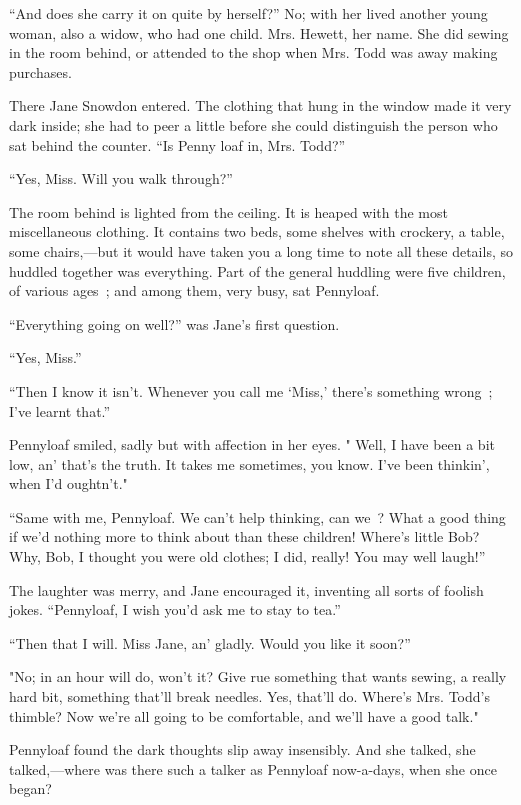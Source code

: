 ``And does she carry it on quite by herself?'' No; with her lived
another young woman, also a widow, who had one child. Mrs. Hewett, her
name. She did sewing in the room behind, or attended to the shop when
Mrs. Todd was away making purchases.

There Jane Snowdon entered. The clothing that hung in the window made it
very dark inside; she had to peer a little before she could distinguish
the person who sat behind the counter. ``Is Penny loaf in, Mrs. Todd?''

``Yes, Miss. Will you walk through?''

The room behind is lighted from the ceiling. It is heaped with the most
miscellaneous clothing. It contains two beds, some shelves with
crockery, a table, some chairs,---but it would have taken you a long
time to note all these {} details, so huddled together was everything.
Part of the general huddling were five children, of various ages~; and
among them, very busy, sat Pennyloaf.

``Everything going on well?'' was Jane's first question.

``Yes, Miss.''

``Then I know it isn't. Whenever you call me `Miss,' there's something
wrong~; I've learnt that.''

Pennyloaf smiled, sadly but with affection in her eyes. " Well, I have
been a bit low, an' that's the truth. It takes me sometimes, you know.
I've been thinkin', when I'd oughtn't."

``Same with me, Pennyloaf. We can't help thinking, can we~? What a good
thing if we'd nothing more to think about than these children! Where's
little Bob? Why, Bob, I thought you were old clothes; I did, really! You
may well laugh!''

The laughter was merry, and Jane encouraged it, inventing all sorts of
foolish jokes. ``Pennyloaf, I wish you'd ask me to stay to tea.''

``Then that I will. Miss Jane, an' gladly. Would you like it soon?''

"No; in an hour will do, won't it? Give {} rue something that wants
sewing, a really hard bit, something that'll break needles. Yes, that'll
do. Where's Mrs. Todd's thimble? Now we're all going to be comfortable,
and we'll have a good talk."

Pennyloaf found the dark thoughts slip away insensibly. And she talked,
she talked,---where was there such a talker as Pennyloaf now-a-days,
when she once began?

